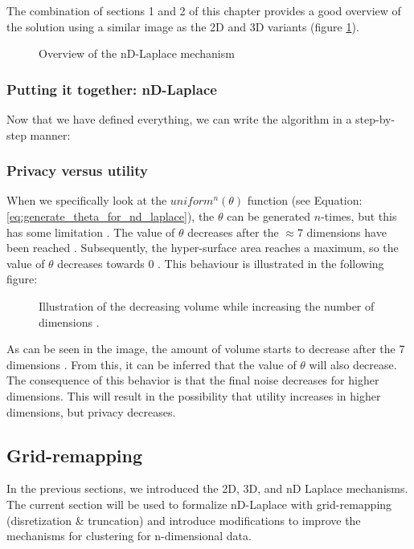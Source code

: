 The combination of sections 1 and 2 of this chapter provides a good overview of the solution using a similar image as the 2D and 3D variants (figure \ref{fig:nd-laplace-overview}).
\begin{figure}[H]
   \centering
  
  \caption{Overview of the nD-Laplace mechanism}
  \label{fig:nd-laplace-overview}
\end{figure}
\newpage

\subsubsection{Putting it together: nD-Laplace}
Now that we have defined everything, we can write the algorithm in a step-by-step manner:

\subsubsection{Privacy versus utility} \label{theory:privacy-utility-nd}
When we specifically look at the \(uniform^n(\theta)\) function (see Equation: \ref{eq:generate_theta_for_nd_laplace}), the \(\theta\) can be generated \(n\)-times, but this has some limitation \citep{weisstein_hypersphere_nodate}.
The value of \(\theta\) decreases after the $\approx 7$ dimensions have been reached \citep{wells_penguin_1997}. Subsequently, the hyper-surface area reaches a maximum, so the value of $\theta$ decreases towards 0 \citep{weisstein_hypersphere_nodate}.
This behaviour is illustrated in the following figure:
\begin{figure}[H]
\centering
  
  \caption{Illustration of the decreasing volume while increasing the number of dimensions \citep{weisstein_hypersphere_nodate}.}
  \label{fig:curse-of-dimensionality}
\end{figure}
As can be seen in the image, the amount of volume starts to decrease after the 7 dimensions . From this, it can be inferred that the value of  $\theta$ will also decrease. 
The consequence of this behavior is that the final noise decreases for higher dimensions. This will result in the possibility that utility increases in higher dimensions, but privacy decreases.

\newpage
\subsection{Grid-remapping \label{section-grid-remapping}}
In the previous sections, we introduced the 2D, 3D, and nD Laplace mechanisms.
The current section will be used to formalize nD-Laplace with grid-remapping (disretization \& truncation) and introduce modifications to improve the mechanisms for clustering for n-dimensional data.

